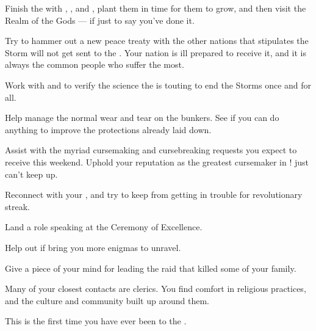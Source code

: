 \documentclass[char]{GL2020}
\begin{document}
\begin{itemz}
    \item Finish the \iBeansNB{} with \cFlowPriest{}, \cAssistantScientist{}, and \cAmbition{}, plant them in time for them to grow, and then visit the Realm of the Gods — if just to say you've done it.
    \item Try to hammer out a new peace treaty with the other nations that stipulates the Storm will not get sent to the \pFarm{}. Your nation is ill prepared to receive it, and it is always the common people who suffer the most.
    \item Work with \cHedonist{} and \cAssistantScientist{} to verify the science the \pTech{} is touting to end the Storms once and for all.
    \item Help \cBunker{} manage the normal wear and tear on the bunkers. See if you can do anything to improve the protections already laid down.
\end{itemz}

\begin{itemz}
    \item Assist with the myriad cursemaking and cursebreaking requests you expect to receive this weekend. Uphold your reputation as the greatest cursemaker in \pEarth{}! \cPrince{} just can’t keep up.
    \item Reconnect with your \cChupLeader{\nibling} \cChupLeader{}, and try to keep \cChupLeader{\them} from getting in trouble for \cChupLeader{\their} revolutionary streak.
    \item Land a role speaking at the Ceremony of Excellence.
    \item Help \cChupSecond{} out if \cChupSecond{\they} bring\cChupSecond{\verbs} you more enigmas to unravel.
  \item Give \cJuniorStatesman{\intro} a piece of your mind for leading the raid that killed some of your family.
\end{itemz}

\begin{itemz}[Notes]
    \item Many of your closest contacts are clerics. You find comfort in religious practices, and the culture and community built up around them.
    \item This is the first time you have ever been to the \pSchool{}.
\end{itemz}
\end{document}
